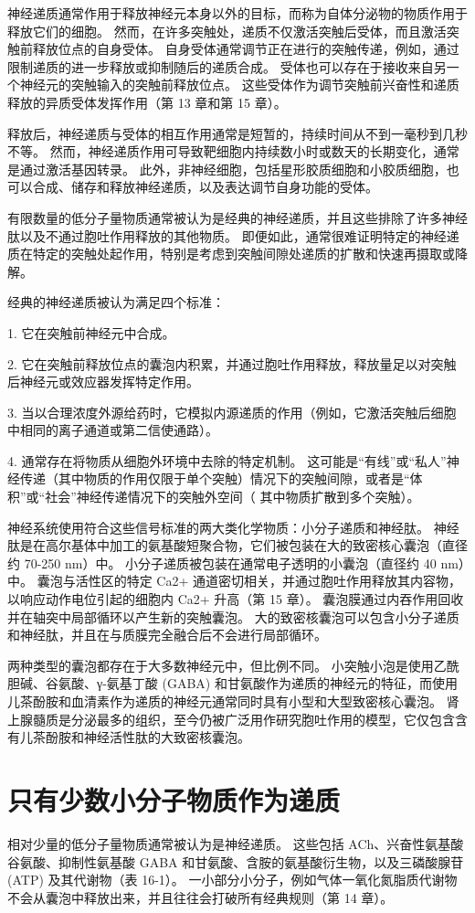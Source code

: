 神经递质通常作用于释放神经元本身以外的目标，而称为自体分泌物的物质作用于释放它们的细胞。 然而，在许多突触处，递质不仅激活突触后受体，而且激活突触前释放位点的自身受体。 自身受体通常调节正在进行的突触传递，例如，通过限制递质的进一步释放或抑制随后的递质合成。 受体也可以存在于接收来自另一个神经元的突触输入的突触前释放位点。 这些受体作为调节突触前兴奋性和递质释放的异质受体发挥作用（第 13 章和第 15 章）。

释放后，神经递质与受体的相互作用通常是短暂的，持续时间从不到一毫秒到几秒不等。 然而，神经递质作用可导致靶细胞内持续数小时或数天的长期变化，通常是通过激活基因转录。 此外，非神经细胞，包括星形胶质细胞和小胶质细胞，也可以合成、储存和释放神经递质，以及表达调节自身功能的受体。

有限数量的低分子量物质通常被认为是经典的神经递质，并且这些排除了许多神经肽以及不通过胞吐作用释放的其他物质。 即便如此，通常很难证明特定的神经递质在特定的突触处起作用，特别是考虑到突触间隙处递质的扩散和快速再摄取或降解。

经典的神经递质被认为满足四个标准：

1. 它在突触前神经元中合成。 

2. 它在突触前释放位点的囊泡内积累，并通过胞吐作用释放，释放量足以对突触后神经元或效应器发挥特定作用。 

3. 当以合理浓度外源给药时，它模拟内源递质的作用（例如，它激活突触后细胞中相同的离子通道或第二信使通路）。 

4. 通常存在将物质从细胞外环境中去除的特定机制。 这可能是“有线”或“私人”神经传递（其中物质的作用仅限于单个突触）情况下的突触间隙，或者是“体积”或“社会”神经传递情况下的突触外空间（ 其中物质扩散到多个突触）。

神经系统使用符合这些信号标准的两大类化学物质：小分子递质和神经肽。 神经肽是在高尔基体中加工的氨基酸短聚合物，它们被包装在大的致密核心囊泡（直径约 70-250 nm）中。 小分子递质被包装在通常电子透明的小囊泡（直径约 40 nm）中。 囊泡与活性区的特定 Ca2+ 通道密切相关，并通过胞吐作用释放其内容物，以响应动作电位引起的细胞内 Ca2+ 升高（第 15 章）。 囊泡膜通过内吞作用回收并在轴突中局部循环以产生新的突触囊泡。 大的致密核囊泡可以包含小分子递质和神经肽，并且在与质膜完全融合后不会进行局部循环。


两种类型的囊泡都存在于大多数神经元中，但比例不同。 小突触小泡是使用乙酰胆碱、谷氨酸、γ-氨基丁酸 (GABA) 和甘氨酸作为递质的神经元的特征，而使用儿茶酚胺和血清素作为递质的神经元通常同时具有小型和大型致密核心囊泡。 肾上腺髓质是分泌最多的组织，至今仍被广泛用作研究胞吐作用的模型，它仅包含含有儿茶酚胺和神经活性肽的大致密核囊泡。


\section{只有少数小分子物质作为递质}
相对少量的低分子量物质通常被认为是神经递质。 这些包括 ACh、兴奋性氨基酸谷氨酸、抑制性氨基酸 GABA 和甘氨酸、含胺的氨基酸衍生物，以及三磷酸腺苷 (ATP) 及其代谢物（表 16-1）。 一小部分小分子，例如气体一氧化氮脂质代谢物不会从囊泡中释放出来，并且往往会打破所有经典规则（第 14 章）。

